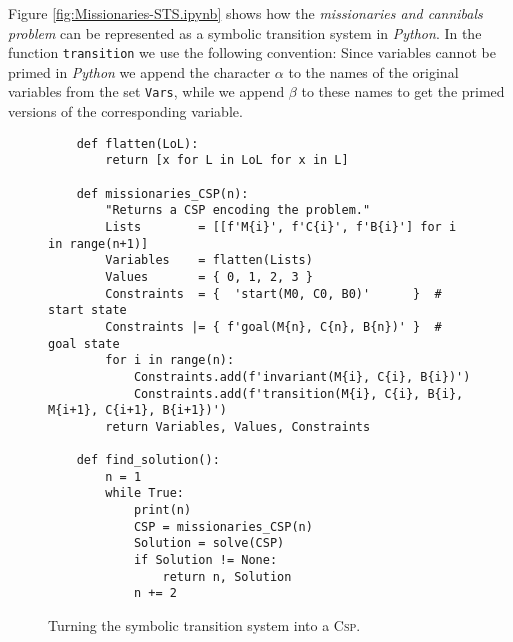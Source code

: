 Figure \ref{fig:Missionaries-STS.ipynb} shows how the \emph{missionaries and cannibals problem} can be
represented as a symbolic transition system in \textsl{Python}.  In the function \texttt{transition} 
we use the following convention: Since variables cannot be primed in
\textsl{Python} we append the character $\alpha$ to the names of the original
variables from the set \texttt{Vars}, while we append $\beta$ to these names to get the primed versions of the
corresponding variable.


\begin{figure}[!ht]
\centering
\begin{verbatim}
    def flatten(LoL):
        return [x for L in LoL for x in L]
                    
    def missionaries_CSP(n):
        "Returns a CSP encoding the problem."
        Lists        = [[f'M{i}', f'C{i}', f'B{i}'] for i in range(n+1)]
        Variables    = flatten(Lists)
        Values       = { 0, 1, 2, 3 }
        Constraints  = {  'start(M0, C0, B0)'      }  # start state
        Constraints |= { f'goal(M{n}, C{n}, B{n})' }  # goal state
        for i in range(n):
            Constraints.add(f'invariant(M{i}, C{i}, B{i})')
            Constraints.add(f'transition(M{i}, C{i}, B{i}, M{i+1}, C{i+1}, B{i+1})')
        return Variables, Values, Constraints
        
    def find_solution():
        n = 1
        while True:
            print(n)
            CSP = missionaries_CSP(n)
            Solution = solve(CSP)
            if Solution != None:
                return n, Solution
            n += 2
\end{verbatim}
\vspace*{-0.3cm}
\caption{Turning the symbolic transition system into a \textsc{Csp}.}
\label{fig:Missionaries-STS.ipynb-2}
\end{figure}


